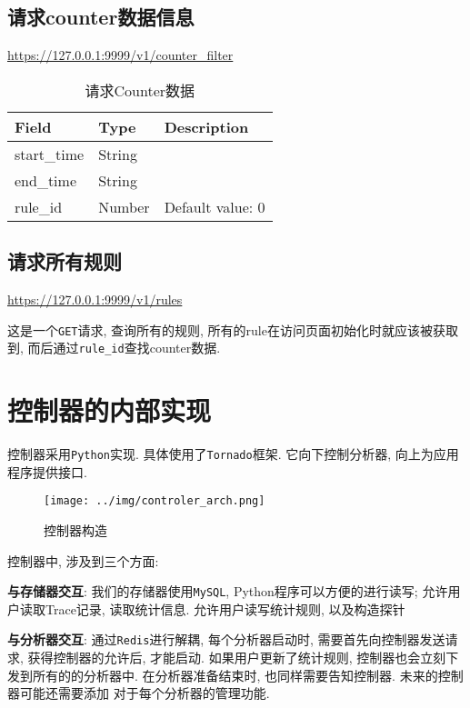 \subsection{请求counter数据信息}

\url{https://127.0.0.1:9999/v1/counter_filter}

\begin{table}[]
    \centering
    \caption{请求Counter数据}
    \label{tbl:get_counter}
    \begin{tabular}{lll}
    Field       & Type   & Description      \\ \hline
    start\_time & String &                  \\
    end\_time   & String &                  \\
    rule\_id    & Number & Default value: 0 \\ \hline
    \end{tabular}
\end{table}

\subsection{请求所有规则}

\url{https://127.0.0.1:9999/v1/rules}

这是一个\texttt{GET}请求, 查询所有的规则, 所有的rule在访问页面初始化时就应该被获取到,
而后通过\texttt{rule\_id}查找counter数据.


\section{控制器的内部实现}

控制器采用\texttt{Python}实现. 具体使用了\texttt{Tornado}框架.
它向下控制分析器, 向上为应用程序提供接口.

\begin{figure}[htbp!]
  \centering
  \texttt{[image: ../img/controler\_arch.png]}
  \caption{控制器构造}
  \label{fig:contoler_arch}
\end{figure}

控制器中, 涉及到三个方面:

\textbf{与存储器交互}: 我们的存储器使用\texttt{MySQL},
Python程序可以方便的进行读写; 允许用户读取Trace记录, 读取统计信息.
允许用户读写统计规则, 以及构造探针

\textbf{与分析器交互}: 通过\texttt{Redis}\cite{redis}进行解耦, 每个分析器启动时,
需要首先向控制器发送请求, 获得控制器的允许后, 才能启动.
如果用户更新了统计规则, 控制器也会立刻下发到所有的的分析器中.
在分析器准备结束时, 也同样需要告知控制器. 未来的控制器可能还需要添加
对于每个分析器的管理功能.

